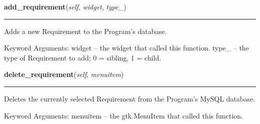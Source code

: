     \vspace{0.5ex}

\hspace{.8\funcindent}\begin{boxedminipage}{\funcwidth}

    \raggedright \textbf{add\_requirement}(\textit{self}, \textit{widget}, \textit{type\_})

    \vspace{-1.5ex}

    \rule{\textwidth}{0.5\fboxrule}
\setlength{\parskip}{2ex}
    Adds a new Requirement to the Program's database.

    Keyword Arguments: widget -- the widget that called this function. 
    type\_  -- the type of Requirement to add; 0 = sibling, 1 = child.

\setlength{\parskip}{1ex}
    \end{boxedminipage}

    \label{reliafree:requirement:Requirement:delete_requirement}

    \vspace{0.5ex}

\hspace{.8\funcindent}\begin{boxedminipage}{\funcwidth}

    \raggedright \textbf{delete\_requirement}(\textit{self}, \textit{menuitem})

    \vspace{-1.5ex}

    \rule{\textwidth}{0.5\fboxrule}
\setlength{\parskip}{2ex}
    Deletes the currently selected Requirement from the Program's MySQL 
    database.

    Keyword Arguments: menuitem -- the gtk.MenuItem that called this 
    function.

\setlength{\parskip}{1ex}
    \end{boxedminipage}

    \label{reliafree:requirement:Requirement:add_vandv_task}

    \vspace{0.5ex}


